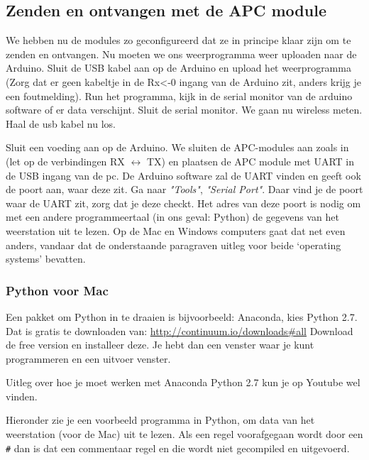 \subsection{Zenden en ontvangen met de APC module}

We hebben nu de modules zo geconfigureerd dat ze in principe klaar zijn
om te zenden en ontvangen. Nu moeten we ons weerprogramma weer uploaden
naar de Arduino. Sluit de USB kabel aan op de Arduino en upload het
weerprogramma (Zorg dat er geen kabeltje in de Rx<-0 ingang van de Arduino zit,
anders krijg je een foutmelding). Run het programma, kijk in de serial monitor van de
arduino software of er data verschijnt. Sluit de serial monitor. We gaan
nu wireless meten. Haal de usb kabel nu los.

Sluit een voeding aan op de Arduino.
We sluiten de APC-modules aan zoals in  (let op de
verbindingen RX $\longleftrightarrow$ TX) en plaatsen de APC module met UART
in de USB ingang van de pc. De Arduino software zal de UART vinden en
geeft ook de poort aan, waar deze zit. Ga naar \emph {"Tools"},
\emph{"Serial Port"}. Daar vind je de poort waar de UART zit, zorg dat je deze checkt.
Het adres van deze poort is nodig om met een andere programmeertaal (in ons
geval: Python) de gegevens van het weerstation uit te lezen.
Op de Mac en Windows computers gaat dat net even anders, vandaar dat de onderstaande
paragraven uitleg voor beide `operating systems' bevatten.

\subsubsection{Python voor Mac}
Een pakket om Python in te draaien is bijvoorbeeld: Anaconda, kies Python 2.7.
Dat is gratis te downloaden van: \url{http://continuum.io/downloads#all}
Download de free version en installeer deze. Je hebt dan een venster waar je kunt
programmeren en een uitvoer venster.

Uitleg over hoe je moet werken met Anaconda Python 2.7 kun je op Youtube wel vinden.

Hieronder zie je een voorbeeld programma in Python, om data van het weerstation
(voor de Mac) uit te lezen.
Als een regel voorafgegaan wordt door een \verb|#| dan is dat een commentaar
regel en die wordt niet gecompiled en uitgevoerd.

